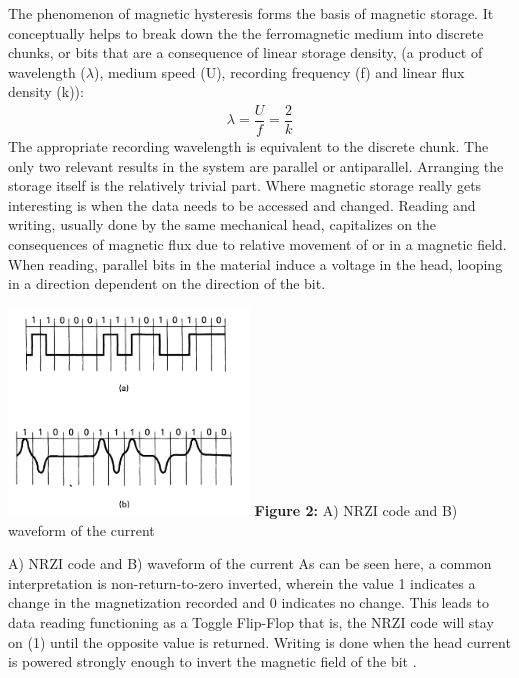 \documentclass[11pt]{article}
\begin{document}
\begin{multicols}{2}
The phenomenon of magnetic hysteresis forms the basis of magnetic storage. It conceptually helps to break down the the ferromagnetic medium into discrete chunks, or bits that are a consequence of linear storage density, (a product of wavelength ($\lambda$), medium speed (U), recording frequency (f) and linear flux density (k)):
\begin{align*}
	\lambda= \dfrac{U}{f} = \dfrac{2}{k}
\end{align*}
The appropriate recording wavelength is equivalent to the discrete chunk. The only two relevant results in the system are parallel or antiparallel. Arranging the storage itself is the relatively trivial part. Where magnetic storage really gets interesting is when the data needs to be accessed and changed. Reading and writing, usually done by the same mechanical head, capitalizes on the consequences of magnetic flux due to relative movement of or in a magnetic field. When reading, parallel bits in the material induce a voltage in the head, looping in a direction dependent on the direction of the bit. 
\begin{center}
	\centering
	\includegraphics[width=0.48\textwidth]{Waveform_code.png}
	{\footnotesize\textbf{Figure 2:}  A) NRZI code and B) waveform of the current\cite{label1}} 
\end{center} 
\cite{label1} A) NRZI code and B) waveform of the current
As can be seen here, a common interpretation is non-return-to-zero inverted, wherein the value 1 indicates a change in the magnetization recorded and 0 indicates no change. This leads to data reading functioning as a Toggle Flip-Flop that is, the NRZI code will stay on (1) until the opposite value is returned. Writing is done when the head current is powered strongly enough to invert the magnetic field of the bit \cite{label1}. 


\end{multicols}
\end{document}
